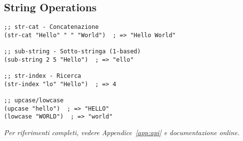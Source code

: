 \subsection{String Operations}

\begin{lstlisting}[language=CLIPS]
;; str-cat - Concatenazione
(str-cat "Hello" " " "World")  ; => "Hello World"

;; sub-string - Sotto-stringa (1-based)
(sub-string 2 5 "Hello")  ; => "ello"

;; str-index - Ricerca
(str-index "lo" "Hello")  ; => 4

;; upcase/lowcase
(upcase "hello")  ; => "HELLO"
(lowcase "WORLD")  ; => "world"
\end{lstlisting}

\textit{Per riferimenti completi, vedere Appendice~\ref{app:api} e documentazione online.}

